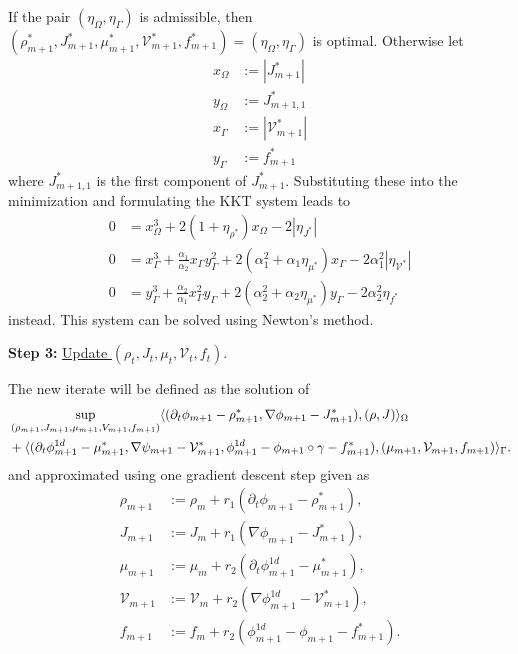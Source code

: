 \documentclass{article}
\DeclarePairedDelimiter{\skp}{\langle}{\rangle}
\begin{document}
If the pair $(\eta_\Omega, \eta_\Gamma)$ is admissible, then $(\rho^*_{m+1}, J^*_{m+1}, \mu^*_{m+1}, \mathcal{V}^*_{m+1}, f^*_{m+1}) = (\eta_\Omega, \eta_\Gamma)$ is optimal. Otherwise let
\begin{align*}
    x_\Omega &:= |J^*_{m+1}|\\
    y_\Omega &:= J^*_{m+1,1}\\
    x_\Gamma &:= |\mathcal{V}^*_{m+1}|\\
    y_\Gamma &:= f^*_{m+1}
\end{align*}
where $J^*_{m+1,1}$ is the first component of $J^*_{m+1}$. Substituting these into the minimization and formulating the KKT system leads to 
\begin{align*}
    0 &= x_\Omega^3 + 2 (1+\eta_{\rho^*}) x_\Omega - 2 | \eta_{J^*}|\\
    0 &= x_\Gamma^3 + \frac{\alpha_1}{\alpha_2} x_\Gamma y_\Gamma^2 + 2 \left( \alpha_1^2 + \alpha_1\eta_{\mu^*}\right) x_\Gamma - 2 \alpha_1^2 |\eta_{\mathcal{V}^*}|\\
    0 &= y_\Gamma^3 + \frac{\alpha_2}{\alpha_1} x_\Gamma^2 y_\Gamma + 2 \left( \alpha_2^2 + \alpha_2\eta_{\mu^*}\right) y_\Gamma - 2 \alpha_2^2 \eta_{f^*}
\end{align*}
instead. This system can be solved using Newton's method. 

\medskip

\noindent \textbf{Step 3:} \underline{Update $(\rho_t, J_t, \mu_t, \mathcal{V}_t, f_t)$}.

\noindent The new iterate will be defined as the solution of
\begin{align*}
    &\sup\limits_{(\rho_{m+1}, J_{m+1}, \mu_{m+1}, V_{m+1}, f_{m+1})} \skp{(\partial_t\phi_{m+1} - \rho^*_{m+1},\nabla\phi_{m+1} - J^*_{m+1}),(\rho, J)}_\Omega\\
    &+\skp{(\partial_t\phi^{1d}_{m+1} - \mu^*_{m+1}, \nabla\psi_{m+1} - \mathcal{V}^*_{m+1}, \phi^{1d}_{m+1}-\phi_{m+1}\circ\gamma - f^*_{m+1}),(\mu_{m+1}, \mathcal{V}_{m+1}, f_{m+1})}_\Gamma.
\end{align*}
and approximated using one gradient descent step given as
\begin{align*}
    \rho_{m+1} &:= \rho_{m} + r_1 \left( \partial_t\phi_{m+1} - \rho^*_{m+1} \right),\\
    J_{m+1} &:= J_{m} + r_1 \left( \nabla\phi_{m+1} - J^*_{m+1} \right),\\
    \mu_{m+1} &:= \mu_{m} + r_2 \left( \partial_t\phi^{1d}_{m+1} - \mu^*_{m+1} \right),\\
    \mathcal{V}_{m+1} &:= \mathcal{V}_m + r_2 \left( \nabla\phi^{1d}_{m+1} - \mathcal{V}^*_{m+1} \right),\\
    f_{m+1} &:= f_{m} + r_2 \left( \phi^{1d}_{m+1} - \phi_{m+1} - f^*_{m+1} \right).
\end{align*}
\end{document}
